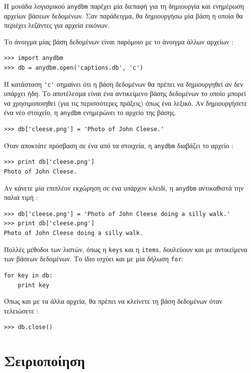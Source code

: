 \documentclass[10pt]{book}
\begin{document}
Η μονάδα λογισμικού  {\tt anydbm}  παρέχει μία διεπαφή για τη δημιουργία και ενημέρωση 
αρχείων βάσεων δεδομένων. Σαν παράδειγμα, θα δημιουργήσω μία βάση η οποία θα περιέχει λεζάντες 
για αρχεία εικόνων.

Το άνοιγμα μίας βάση δεδομένων είναι παρόμοιο με το άνοιγμα άλλων αρχείων :

\begin{verbatim}
>>> import anydbm
>>> db = anydbm.open('captions.db', 'c')
\end{verbatim}
%
 Η κατάσταση  \verb"'c'"  σημαίνει ότι η βάση δεδομένων θα πρέπει να δημιουργηθεί 
αν δεν υπάρχει ήδη. Το αποτέλεσμα είναι ένα αντικείμενο βάσης δεδομένων το οποίο μπορεί να χρησιμοποιηθεί (για τις περισσότερες πράξεις) όπως ένα λεξικό. Αν δημιουργήσετε ένα νέο στοιχείο, η  {\tt anydbm}  ενημερώνει το αρχείο της βάσης. 


\begin{verbatim}
>>> db['cleese.png'] = 'Photo of John Cleese.'
\end{verbatim}
%
 Όταν αποκτάτε πρόσβαση σε ένα από τα στοιχεία, η  {\tt anydbm}  διαβάζει το αρχείο :

\begin{verbatim}
>>> print db['cleese.png']
Photo of John Cleese.
\end{verbatim}
%
 Αν κάνετε μία επιπλέον εκχώρηση σε ένα υπάρχον κλειδί, η  {\tt anydbm}  αντικαθιστά την παλιά τιμή :

\begin{verbatim}
>>> db['cleese.png'] = 'Photo of John Cleese doing a silly walk.'
>>> print db['cleese.png']
Photo of John Cleese doing a silly walk.
\end{verbatim}
%
 Πολλές μέθοδοι των λιστών, όπως η  {\tt keys}  και η  {\tt items},  δουλεύουν και με αντικείμενα των βάσεων δεδομένων. Το ίδιο ισχύει και με μία δήλωση  {\tt for}:

\begin{verbatim}
for key in db:
    print key
\end{verbatim}
%
 Όπως και με τα άλλα αρχεία, θα πρέπει να κλείνετε τη βάση δεδομένων όταν τελειώσετε :

\begin{verbatim}
>>> db.close()
\end{verbatim}
%


 
\section{Σειριοποίηση}
\end{document}
